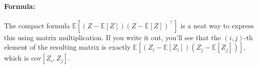 \documentclass[11pt,a4paper]{article}
\begin{document}
\paragraph{Formula:} The compact formula $\mathbb{E}[(Z - \mathbb{E}[Z])(Z - \mathbb{E}[Z])^\top]$ is a neat way to express this using matrix multiplication. If you write it out, you'll see that the $(i,j)$-th element of the resulting matrix is exactly $\mathbb{E}[(Z_i - \mathbb{E}[Z_i])(Z_j - \mathbb{E}[Z_j])]$, which is $\text{cov}[Z_i, Z_j]$.
\end{document}
